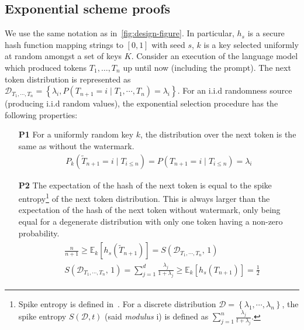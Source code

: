 \subsection{Exponential scheme proofs}
\label{app:ssec:pseudorandom-proofs}

We use the same notation as in~\cref{fig:design-figure}. In particular, $h_s$ is
a secure hash function mapping strings to $[0,1]$ with seed $s$, $k$ is a key selected uniformly 
at random amongst a set of keys $K$. Consider an execution of the language model which produced 
tokens $T_1,\ldots,T_n$ up until now (including the prompt). The next token distribution is represented as
$\mathcal{D}_{T_1,\cdots,T_n} = \left\{\lambda_i, P(T_{n+1} = i \mid T_1,\cdots, T_n) = \lambda_i\right\}$.
%
For an i.i.d randomness source (producing i.i.d random values), 
the exponential selection procedure has the following properties:

\begin{enumerate}[leftmargin=\itemlm,nosep]
    \item[\textbf{P1}] For a uniformly random key $k$, the distribution over the next token is the 
    same as without the watermark.
        \begin{align}
            P_k(\widetilde{T}_{n+1} = i \mid T_{i\leq n} ) 
            = P(T_{n+1} = i \mid T_{i\leq n} )
            = \lambda_i
        \end{align}
    \item[\textbf{P2}] The expectation of the hash of the next token is equal to the spike 
    entropy\footnote{Spike entropy is defined in~\cite{kirchenbauer_watermark_2023}. For a 
    discrete distribution $\mathcal{D} = \left\{ \lambda_1, \cdots, \lambda_n \right\}$, the 
    spike entropy $S\left(\mathcal{D}, t\right)$ (said \textit{modulus} i) is defined as 
    $\sum_{j=1}^{n} \frac{\lambda_j}{t+\lambda_j}$.} of the next token distribution. This is 
    always larger than the expectation of the hash of the next token without watermark, only 
    being equal for a degenerate distribution with only one token having a non-zero probability.
        \begin{align}
        \begin{split}
            &\frac{n}{n+1} \geq \mathbb{E}_k\left[ h_s\left(\widetilde{T}_{n+1}\right) \right] = S\left(\mathcal{D}_{T_1,\cdots,T_n},\, 1\right) \\
            &S\left(\mathcal{D}_{T_1,\cdots,T_n},\, 1\right) = \sum_{j=1}^{d} \frac{\lambda_j}{1+\lambda_j} \geq \mathbb{E}_k\left[ h_s\left(T_{n+1}\right) \right] = \frac{1}{2}
        \end{split}
        \end{align}
\end{enumerate}

